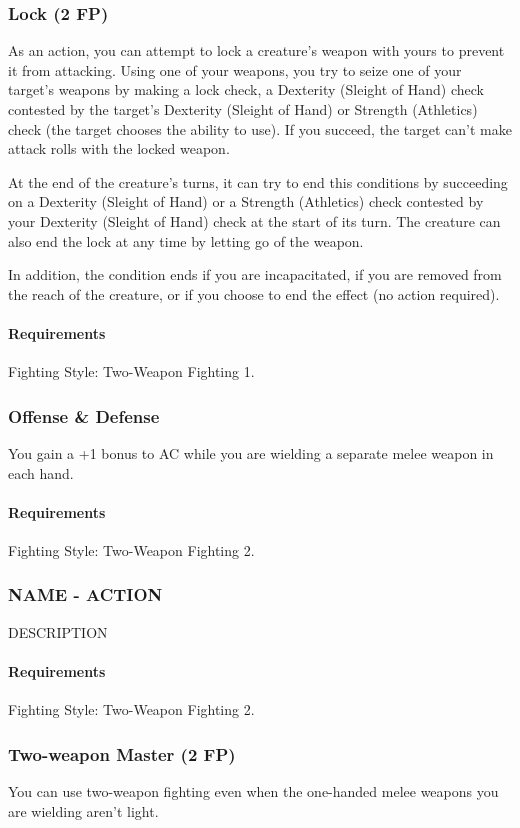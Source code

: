 \subsubsection{Lock (2 FP)} \label{feat::lock}
    As an action, you can attempt to lock a creature's weapon with yours to prevent it from attacking.
    Using one of your weapons, you try to seize one of your target's weapons by making a lock check, a Dexterity (Sleight of Hand) check contested by the target's Dexterity (Sleight of Hand) or Strength (Athletics) check (the target chooses the ability to use).
    If you succeed, the target can't make attack rolls with the locked weapon.

    At the end of the creature's turns, it can try to end this conditions by succeeding on a Dexterity (Sleight of Hand) or a Strength (Athletics) check contested by your Dexterity (Sleight of Hand) check at the start of its turn.
    The creature can also end the lock at any time by letting go of the weapon.

    In addition, the condition ends if you are incapacitated, if you are removed from the reach of the creature, or if you choose to end the effect (no action required).
    \paragraph{Requirements} Fighting Style: Two-Weapon Fighting 1.
\subsubsection{Offense \& Defense} \label{feat::offenseanddefense}
    You gain a +1 bonus to AC while you are wielding a separate melee weapon in each hand.
    \paragraph{Requirements} Fighting Style: Two-Weapon Fighting 2.
\subsubsection{NAME - ACTION} \label{feat::name}
    DESCRIPTION
    \paragraph{Requirements} Fighting Style: Two-Weapon Fighting 2.
\subsubsection{Two-weapon Master (2 FP)} \label{feat::twoweaponmaster}
    You can use two-weapon fighting even when the one-handed melee weapons you are wielding aren't light.

